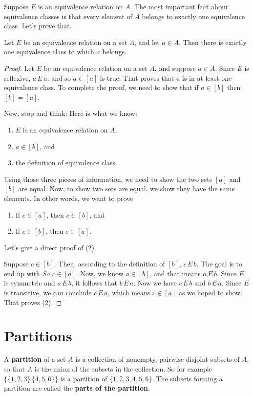 Suppose $E$ is an equivalence relation on $A$. 
The most important fact about equivalence classes is that every
element of $A$ belongs to exactly one equivalence class. Let's prove that.

\begin{thm}\label{thm:eqvrel->partition}
 Let $E$ be an equivalence relation on a set $A$, and let
 $a\in A$. Then there is exactly one equivalence class to which $a$ belongs.
\end{thm}
\begin{proof}
 Let $E$ be an equivalence relation on a set $A$, and suppose $a\in A$.
 Since $E$ is reflexive, $a\,E\,a$, and so $a\in [a]$ is true. That proves that $a$
 is in at least one equivalence class. To complete the proof, we need to show that
 if $a\in [b]$ then $[b]=[a]$. 
 
 Now, stop and think: Here is what we know: 
\begin{enumerate}
 \item $E$ is an equivalence relation on $A$,
 \item $a\in [b]$, and 
 \item the definition of equivalence class.
\end{enumerate} Using those three pieces of
 information, we need to show the two sets $[a]$ and $[b]$ are equal.
 Now, to show two sets are equal, we show they have the same elements.
 In other words, we want to prove 
\begin{enumerate}
 \item If $c\in [a]$, then $c\in [b]$, and%
   
 \item If $c\in [b]$, then $c\in [a]$.
\end{enumerate}
 Let's give a direct proof of (2).
 
 Suppose $c\in [b]$. Then, according to the definition of $[b]$, $c\,E\,b$.
 The goal is to end up with {\itshape So $c\in [a]$}.  Now, we know $a\in [b]$,
 and that means $a\,E\,b$. Since $E$ is symmetric and $a\,E\,b$, it follows that $b\,E\,a$.
 Now we have $c\,E\,b$ and $b\,E\,a$. Since $E$ is transitive, we can conclude
 $c\,E\,a$, which means $c\in [a]$ as we hoped to show. That proves (2).
\end{proof}

 

\section{Partitions}
\begin{defn}
 A {\bfseries partition} of a set  $A$ is a collection of nonempty, 
 pairwise disjoint subsets of $A$, so that $A$ is
 the union of the subsets in the collection. 
 So for example $\{\{1,2,3\}\,\{4,5,6\}\}$ is a partition
 of $\{1,2,3,4,5,6\}$. 
 The subsets forming a partition are called the {\bfseries parts of the partition}.
\end{defn}


